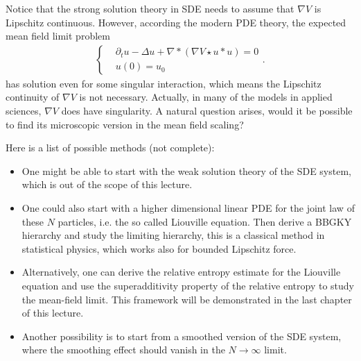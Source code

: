 Notice that the strong solution theory in SDE needs to assume that  $\nabla V$ is Lipschitz continuous. However, according the modern PDE theory, the expected mean field limit problem 
\begin{align*}
\begin{cases}
&\partial_t u - \Delta u + \nabla * (\nabla V \star  u * u) = 0\\
&u(0) = u_{0}
\end{cases}
.\end{align*}
has solution even for some singular interaction, which means the Lipschitz continuity of $\nabla V$ is not necessary. Actually, in many of the models in applied sciences, $\nabla V$ does have singularity. A natural question arises, would it be possible to find its microscopic version in the mean field scaling? 

Here is a list of possible methods (not complete):
\begin{itemize}
	\item One might be able to start with the weak solution theory of the SDE system, which is out of the scope of this lecture. 
	\item One could also start with a higher dimensional linear PDE for the joint law of these $N$ particles, i.e. the so called Liouville equation. Then derive a BBGKY hierarchy and study the limiting hierarchy, this is a classical method in statistical physics, which works also for bounded Lipschitz force.
	\item  Alternatively, one can derive the relative entropy estimate for the Liouville equation and use the superadditivity property of the relative entropy to study the mean-field limit. This framework will be demonstrated in the last chapter of this lecture.
	\item Another possibility is to start from a smoothed version of the SDE system, where the smoothing effect should vanish in the $N\to \infty$ limit. 
\end{itemize}


